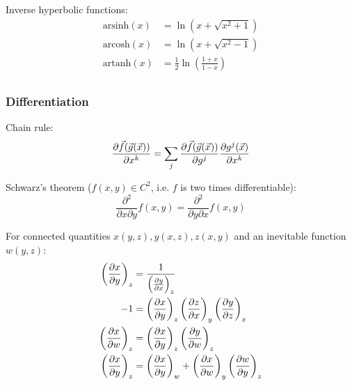			\noindent
			Inverse hyperbolic functions:
			\begin{equation}
				\begin{aligned}
					\mathrm{arsinh}(x) &= \ln\left(x+\sqrt{x^2+1}\right) \\
					\mathrm{arcosh}(x) &= \ln\left(x+\sqrt{x^2-1}\right) \\
					\mathrm{artanh}(x) &= \frac{1}{2}\ln\left(\frac{1+x}{1-x}\right) \\
				\end{aligned}
			\end{equation}

		\subsubsection{Differentiation}
			\noindent
			Chain rule:
			\begin{equation}
				\frac{\partial \vec{f}(\vec{g}(\vec{x}))}{\partial x^k} = \sum_j \frac{\partial  \vec{f}(\vec{g}(\vec{x}))}{\partial g^j} \frac{\partial g^j(\vec{x})}{\partial x^k}
			\end{equation}

			\noindent
			Schwarz's theorem ($f(x,y)\in C^2$, i.e. $f$ is two times differentiable):
			\begin{equation}
				\frac{\partial^2 }{\partial x \partial y} f(x,y) = \frac{\partial^2 }{\partial y \partial x} f(x,y)
			\end{equation}

			\noindent
			For connected quantities $x(y,z), y(x,z), z(x,y)$ and an inevitable function $w(y,z)$:
			\begin{equation}
				\begin{aligned}
					\left( \frac{\partial x}{\partial y} \right)_z &= \frac{1}{\left( \frac{\partial y}{\partial x} \right)_z} \\
					-1 &= \left( \frac{\partial x}{\partial y} \right)_z \left( \frac{\partial z}{\partial x} \right)_y \left( \frac{\partial y}{\partial z} \right)_x \\
					\left( \frac{\partial x}{\partial w} \right)_z &= \left( \frac{\partial x}{\partial y} \right)_z \left( \frac{\partial y}{\partial w} \right)_z \\
					\left( \frac{\partial x}{\partial y} \right)_z &= \left( \frac{\partial x}{\partial y} \right)_w + \left( \frac{\partial x}{\partial w} \right)_y \left( \frac{\partial w}{\partial y} \right)_z \\
				\end{aligned}
			\end{equation}


